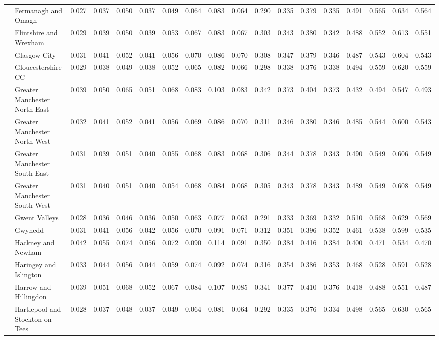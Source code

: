 \begin{tabular}{llrrrrrrrrrrrrrrrr}
 & Fermanagh and Omagh & 0.027 & 0.037 & 0.050 & 0.037 & 0.049 & 0.064 & 0.083 & 0.064 & 0.290 & 0.335 & 0.379 & 0.335 & 0.491 & 0.565 & 0.634 & 0.564 \\
 & Flintshire and Wrexham & 0.029 & 0.039 & 0.050 & 0.039 & 0.053 & 0.067 & 0.083 & 0.067 & 0.303 & 0.343 & 0.380 & 0.342 & 0.488 & 0.552 & 0.613 & 0.551 \\
 & Glasgow City & 0.031 & 0.041 & 0.052 & 0.041 & 0.056 & 0.070 & 0.086 & 0.070 & 0.308 & 0.347 & 0.379 & 0.346 & 0.487 & 0.543 & 0.604 & 0.543 \\
 & Gloucestershire CC & 0.029 & 0.038 & 0.049 & 0.038 & 0.052 & 0.065 & 0.082 & 0.066 & 0.298 & 0.338 & 0.376 & 0.338 & 0.494 & 0.559 & 0.620 & 0.559 \\
 & Greater Manchester North East & 0.039 & 0.050 & 0.065 & 0.051 & 0.068 & 0.083 & 0.103 & 0.083 & 0.342 & 0.373 & 0.404 & 0.373 & 0.432 & 0.494 & 0.547 & 0.493 \\
 & Greater Manchester North West & 0.032 & 0.041 & 0.052 & 0.041 & 0.056 & 0.069 & 0.086 & 0.070 & 0.311 & 0.346 & 0.380 & 0.346 & 0.485 & 0.544 & 0.600 & 0.543 \\
 & Greater Manchester South East & 0.031 & 0.039 & 0.051 & 0.040 & 0.055 & 0.068 & 0.083 & 0.068 & 0.306 & 0.344 & 0.378 & 0.343 & 0.490 & 0.549 & 0.606 & 0.549 \\
 & Greater Manchester South West & 0.031 & 0.040 & 0.051 & 0.040 & 0.054 & 0.068 & 0.084 & 0.068 & 0.305 & 0.343 & 0.378 & 0.343 & 0.489 & 0.549 & 0.608 & 0.549 \\
 & Gwent Valleys & 0.028 & 0.036 & 0.046 & 0.036 & 0.050 & 0.063 & 0.077 & 0.063 & 0.291 & 0.333 & 0.369 & 0.332 & 0.510 & 0.568 & 0.629 & 0.569 \\
 & Gwynedd & 0.031 & 0.041 & 0.056 & 0.042 & 0.056 & 0.070 & 0.091 & 0.071 & 0.312 & 0.351 & 0.396 & 0.352 & 0.461 & 0.538 & 0.599 & 0.535 \\
 & Hackney and Newham & 0.042 & 0.055 & 0.074 & 0.056 & 0.072 & 0.090 & 0.114 & 0.091 & 0.350 & 0.384 & 0.416 & 0.384 & 0.400 & 0.471 & 0.534 & 0.470 \\
 & Haringey and Islington & 0.033 & 0.044 & 0.056 & 0.044 & 0.059 & 0.074 & 0.092 & 0.074 & 0.316 & 0.354 & 0.386 & 0.353 & 0.468 & 0.528 & 0.591 & 0.528 \\
 & Harrow and Hillingdon & 0.039 & 0.051 & 0.068 & 0.052 & 0.067 & 0.084 & 0.107 & 0.085 & 0.341 & 0.377 & 0.410 & 0.376 & 0.418 & 0.488 & 0.551 & 0.487 \\
 & Hartlepool and Stockton-on-Tees & 0.028 & 0.037 & 0.048 & 0.037 & 0.049 & 0.064 & 0.081 & 0.064 & 0.292 & 0.335 & 0.376 & 0.334 & 0.498 & 0.565 & 0.630 & 0.565 \\

\end{tabular}
